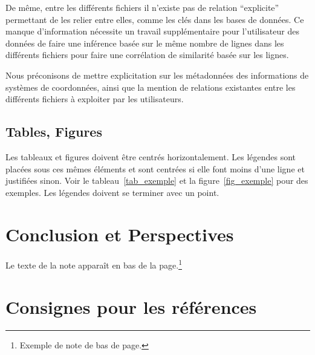 \documentclass[a4paper,pagenum,french,showlayout]{rnti}
\begin{document}
De même, entre les différents fichiers il n’existe pas de relation “explicite” permettant de les relier entre elles, comme les clés dans les bases de données. Ce manque d’information nécessite un travail supplémentaire pour l’utilisateur des données de faire une inférence basée sur le même nombre de lignes dans les différents fichiers pour faire une corrélation de similarité basée sur les lignes.

Nous préconisons de mettre explicitation sur les métadonnées des informations de systèmes de coordonnées, ainsi que la mention de relations existantes entre les différents fichiers à exploiter par les utilisateurs. 



\subsection{Tables, Figures}

Les tableaux et figures doivent être centrés horizontalement. Les
légendes sont placées sous ces mêmes éléments et sont centrées si
elle font moins d'une ligne et justifiées sinon. Voir le
tableau~\ref{tab_exemple} et la figure~\ref{fig_exemple} pour des
exemples. Les légendes doivent se terminer avec un point.











\section{Conclusion et Perspectives}

Le texte de la note apparaît en bas de la page.\footnote{Exemple de
note de bas de page.}




\section{Consignes pour les références}
\end{document}
